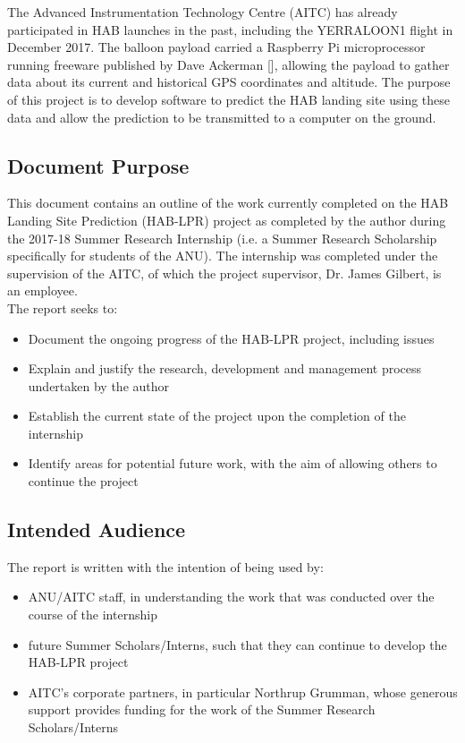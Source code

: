 \documentclass[11pt]{article}
\begin{document}
The Advanced Instrumentation Technology Centre (AITC) has already participated in HAB launches in the past, including the YERRALOON1 flight in December 2017. The balloon payload carried a Raspberry Pi microprocessor running freeware published by Dave Ackerman [], allowing the payload to gather data about its current and historical GPS coordinates and altitude. The purpose of this project is to develop software to predict the HAB landing site using these data and allow the prediction to be transmitted to a computer on the ground.

\subsection{Document Purpose}

This document contains an outline of the work currently completed on the HAB Landing Site Prediction (HAB-LPR) project as completed by the author during the 2017-18 Summer Research Internship (i.e. a Summer Research Scholarship specifically for students of the ANU). The internship was completed under the supervision of the AITC, of which the project supervisor, Dr. James Gilbert, is an employee. \\

The report seeks to:
\begin{itemize}
\item Document the ongoing progress of the HAB-LPR project, including issues
\item Explain and justify the research, development and management process undertaken by the author
\item Establish the current state of the project upon the completion of the internship
\item Identify areas for potential future work, with the aim of allowing others to continue the project
\end{itemize}


\subsection{Intended Audience}
The report is written with the intention of being used by: 
\begin{itemize}
\item ANU/AITC staff, in understanding the work that was conducted over the course of the internship
\item future Summer Scholars/Interns, such that they can continue to develop the HAB-LPR project
\item AITC's corporate partners, in particular Northrup Grumman, whose generous support provides funding for the work of the Summer Research Scholars/Interns
\end{itemize}
\end{document}
